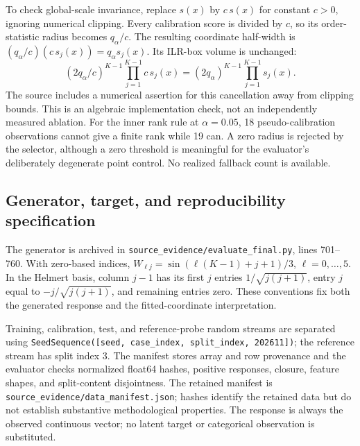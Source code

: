 \documentclass{article}
\begin{document}
To check global-scale invariance, replace $s(x)$ by $c\,s(x)$ for constant $c>0$, ignoring numerical clipping. Every calibration score is divided by $c$, so its order-statistic radius becomes $q_\alpha/c$. The resulting coordinate half-width is $(q_\alpha/c)(c\,s_j(x))=q_\alpha s_j(x)$. Its ILR-box volume is unchanged:
\begin{equation}
 (2q_\alpha/c)^{K-1}\prod_{j=1}^{K-1}c\,s_j(x)
 =(2q_\alpha)^{K-1}\prod_{j=1}^{K-1}s_j(x).
\end{equation}
The source includes a numerical assertion for this cancellation away from clipping bounds. This is an algebraic implementation check, not an independently measured ablation. For the inner rank rule at $\alpha=0.05$, 18 pseudo-calibration observations cannot give a finite rank while 19 can. A zero radius is rejected by the selector, although a zero threshold is meaningful for the evaluator's deliberately degenerate point control. No realized fallback count is available. %

\subsection{Generator, target, and reproducibility specification}
The generator is archived in \texttt{source\_evidence/evaluate\_final.py}, lines 701--760. With zero-based indices, $W_{\ell j}=\sin(\ell(K-1)+j+1)/3$, $\ell=0,\ldots,5$. In the Helmert basis, column $j-1$ has its first $j$ entries $1/\sqrt{j(j+1)}$, entry $j$ equal to $-j/\sqrt{j(j+1)}$, and remaining entries zero. These conventions fix both the generated response and the fitted-coordinate interpretation. %

Training, calibration, test, and reference-probe random streams are separated using \texttt{SeedSequence([seed, case\_index, split\_index, 202611])}; the reference stream has split index 3. The manifest stores array and row provenance and the evaluator checks normalized float64 hashes, positive responses, closure, feature shapes, and split-content disjointness. The retained manifest is \texttt{source\_evidence/data\_manifest.json}; hashes identify the retained data but do not establish substantive methodological properties. The response is always the observed continuous vector; no latent target or categorical observation is substituted. %
\end{document}
